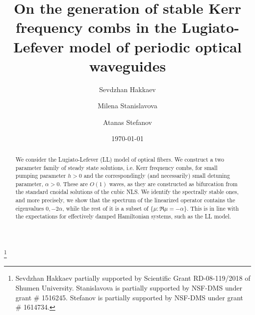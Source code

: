 \documentclass[12pt]{amsart}
\theoremstyle{definition}
\theoremstyle{remark}
\numberwithin{equation}{section}
\renewcommand{\(}{\left(}
\renewcommand{\)}{\right)}
\renewcommand{\[}{\left[}
\renewcommand{\]}{\right]}
\newcommand{\al}{\alpha}
\begin{document}
\title[Stable frequency combs in   periodic waveguides]
 {On the generation of  stable Kerr   frequency combs in the  Lugiato-Lefever model of periodic optical waveguides}




\thanks{Sevdzhan Hakkaev partially supported by Scientific Grant RD-08-119/2018 of Shumen University.
 Stanislavova is partially supported by  NSF-DMS under grant \# 1516245.   Stefanov    is partially  supported by  NSF-DMS under grant \# 1614734.}

\author[S. Hakkaev]{\sc Sevdzhan Hakkaev}
\address{ Department of Mathematics and Computer Science, Istanbul Aydin University, Istanbul, Turkey}



\address{Faculty of Mathematics and Informatics, Shumen University, Shumen, Bulgaria}


\author[M.  Stanislavova]{\sc Milena Stanislavova}
\address{ Department of Mathematics,
University of Kansas,
1460 Jayhawk Boulevard,  Lawrence KS 66045--7523, USA}

\author[A. Stefanov]{\sc Atanas Stefanov}
\address{ Department of Mathematics,
University of Kansas,
1460 Jayhawk Boulevard,  Lawrence KS 66045--7523, USA}




\date{\today}


\begin{abstract}

We consider the Lugiato-Lefever (LL) model of optical fibers. We construct a two parameter family of steady state solutions, i.e. Kerr frequency combs, for small pumping parameter $h>0$ and the correspondingly (and necessarily) small  detuning parameter, $\al >0$. These are $O(1)$ waves, as they are constructed as   bifurcation  from the standard cnoidal  solutions of the  cubic NLS.  We identify the  spectrally  stable ones, and more precisely,  we show that  the spectrum of the linearized operator contains the eigenvalues $0, -2\al$, while the rest of it is  a subset of $ \{\mu: \Re\mu=-\al \}$.  This is in line with the expectations for effectively damped Hamiltonian systems, such as the LL model.



\end{abstract}
\end{document}

